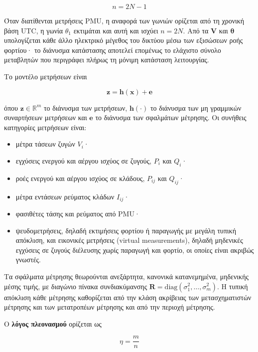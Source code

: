 \begin{equation}
n = 2N - 1
\label{eq:nstates}
\end{equation}

Όταν διατίθενται μετρήσεις PMU, η αναφορά των γωνιών ορίζεται από τη χρονική βάση UTC, η
γωνία $\theta_1$ εκτιμάται και αυτή και ισχύει $n = 2N$. Από τα $\mathbf{V}$ και
$\boldsymbol{\theta}$ υπολογίζεται κάθε άλλο ηλεκτρικό μέγεθος του δικτύου μέσω των εξισώσεων
ροής φορτίου· το διάνυσμα κατάστασης αποτελεί επομένως το ελάχιστο σύνολο μεταβλητών που
περιγράφει πλήρως τη μόνιμη κατάσταση λειτουργίας.

Το μοντέλο μετρήσεων είναι

\begin{equation}
\mathbf{z} = \mathbf{h}(\mathbf{x}) + \mathbf{e}
\label{eq:measmodel}
\end{equation}

όπου $\mathbf{z} \in \mathbb{R}^{m}$ το διάνυσμα των μετρήσεων, $\mathbf{h}(\cdot)$ το
διάνυσμα των μη γραμμικών συναρτήσεων μετρήσεων και $\mathbf{e}$ το διάνυσμα των σφαλμάτων
μέτρησης. Οι συνήθεις κατηγορίες μετρήσεων είναι:

\begin{itemize}
\item μέτρα τάσεων ζυγών $V_i$·
\item εγχύσεις ενεργού και αέργου ισχύος σε ζυγούς, $P_i$ και $Q_i$·
\item ροές ενεργού και αέργου ισχύος σε κλάδους, $P_{ij}$ και $Q_{ij}$·
\item μέτρα εντάσεων ρεύματος κλάδων $I_{ij}$·
\item φασιθέτες τάσης και ρεύματος από PMU·
\item ψευδομετρήσεις, δηλαδή εκτιμήσεις φορτίου ή παραγωγής με μεγάλη τυπική απόκλιση, και
      εικονικές μετρήσεις (virtual measurements), δηλαδή μηδενικές εγχύσεις σε ζυγούς
      διέλευσης χωρίς παραγωγή και φορτίο, οι οποίες είναι ακριβώς γνωστές.
\end{itemize}

Τα σφάλματα μέτρησης θεωρούνται ανεξάρτητα, κανονικά κατανεμημένα, μηδενικής μέσης τιμής, με
διαγώνιο πίνακα συνδιακύμανσης $\mathbf{R} = \mathrm{diag}(\sigma_1^2, \ldots, \sigma_m^2)$. Η
τυπική απόκλιση κάθε μέτρησης καθορίζεται από την κλάση ακρίβειας των μετασχηματιστών μέτρησης
και των μετατροπέων μέτρησης και από την περιοχή μέτρησης.

Ο \textbf{λόγος πλεονασμού} ορίζεται ως

\begin{equation}
\eta = \frac{m}{n}
\label{eq:redundancy}
\end{equation}


